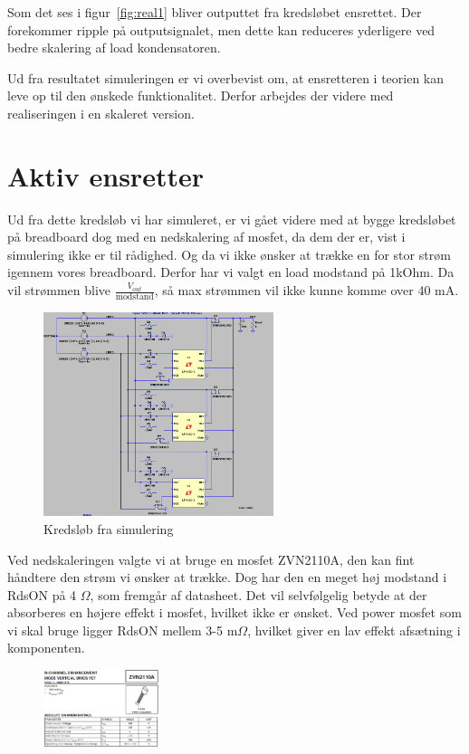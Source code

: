 Som det ses i figur~\ref{fig:real1} bliver outputtet fra kredsløbet ensrettet. Der forekommer ripple på outputsignalet, men dette kan reduceres yderligere ved bedre skalering af load kondensatoren. 

Ud fra resultatet simuleringen er vi overbevist om, at ensretteren i teorien kan leve op til den ønskede funktionalitet. Derfor arbejdes der videre med realiseringen i en skaleret version. 
\clearpage
\section{Aktiv ensretter}
\label{sec:aktiv-ensretter-1}

Ud fra dette kredsløb vi har simuleret, er vi gået videre med at bygge kredsløbet på breadboard dog med en nedskalering af mosfet, da dem der er, vist i simulering ikke er til rådighed. Og da vi ikke ønsker at trække en for stor strøm igennem vores breadboard. Derfor har vi valgt en load modstand på 1kOhm. Da vil strømmen blive $\frac{V_{out}}{\mathrm{modstand}}$, så max strømmen vil ikke kunne komme over 40 mA.

\begin{figure}[h]
  \centering
  \includegraphics[width=0.6\textwidth]{schem2.png}
  \caption{Kredsløb fra simulering}
  \label{fig:schem2}
\end{figure}

Ved nedskaleringen valgte vi at bruge en mosfet ZVN2110A, den kan fint håndtere den strøm vi ønsker at trække. Dog har den en meget høj modstand i RdsON på 4 $\Omega$, som fremgår af datasheet. Det vil selvfølgelig betyde at der absorberes en højere effekt i mosfet, hvilket ikke er ønsket. Ved power mosfet som vi skal bruge ligger RdsON mellem 3-5 m$\Omega$, hvilket giver en lav effekt afsætning i komponenten.
\begin{figure}[h]
  \centering
  \includegraphics[width=0.3\textwidth]{pic2.png}
  \label{fig:schem2}
\end{figure}
\clearpage
